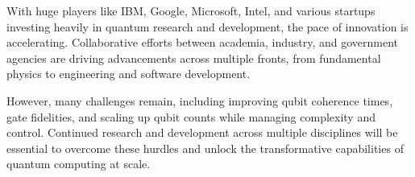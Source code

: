 \documentclass{elbioimp2}
\begin{document}
With huge players like IBM, Google, Microsoft, Intel, and various startups investing heavily in quantum research and development, the pace of innovation is accelerating. Collaborative efforts between academia, industry, and government agencies are driving advancements across multiple fronts, from fundamental physics to engineering and software development.

However, many challenges remain, including improving qubit coherence times, gate fidelities, and scaling up qubit counts while managing complexity and control. Continued research and development across multiple disciplines will be essential to overcome these hurdles and unlock the transformative capabilities of quantum computing at scale.

\newpage

\nocite{*}

\printbibliography[heading=bibintoc,title={References}]
\end{document}

